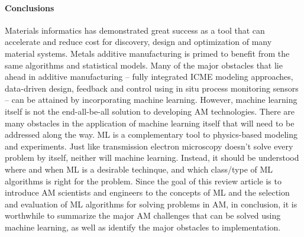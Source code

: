 \paragraph{Conclusions}
Materials informatics has demonstrated great success as a tool that can accelerate and reduce cost for discovery, design and optimization of many material systems. Metals additive manufacturing is primed to benefit from the same algorithms and statistical models. Many of the major obstacles that lie ahead in additive manufacturing -- fully integrated ICME modeling approaches, data-driven design, feedback and control using in situ process monitoring sensors -- can be attained by incorporating machine learning. However, machine learning itself is not the end-all-be-all solution to developing AM technologies. There are many obstacles in the application of machine learning itself that will need to be addressed along the way. ML is a complementary tool to physics-based modeling and experiments. Just like transmission electron microscopy doesn't solve every problem by itself, neither will machine learning. Instead, it should be understood where and when ML is a desirable techinque, and which class/type of ML algorithms is right for the problem. Since the goal of this review article is to introduce AM scientists and engineers to the concepts of ML and the selection and evaluation of ML algorithms for solving problems in AM, in conclusion, it is worthwhile to summarize the major AM challenges that can be solved using machine learning, as well as identify the major obstacles to implementation.

